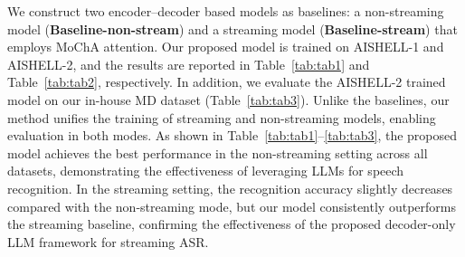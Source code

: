 \documentclass{article}
\begin{document}
We construct two encoder–decoder based models as baselines: a non-streaming model (\textbf{Baseline-non-stream}) and a streaming model (\textbf{Baseline-stream}) that employs MoChA attention. Our proposed model is trained on AISHELL-1 and AISHELL-2, and the results are reported in Table~\ref{tab:tab1} and Table~\ref{tab:tab2}, respectively. In addition, we evaluate the AISHELL-2 trained model on our in-house MD dataset (Table~\ref{tab:tab3}).
Unlike the baselines, our method unifies the training of streaming and non-streaming models, enabling evaluation in both modes. As shown in Table~\ref{tab:tab1}–\ref{tab:tab3}, the proposed model achieves the best performance in the non-streaming setting across all datasets, demonstrating the effectiveness of leveraging LLMs for speech recognition. In the streaming setting, the recognition accuracy slightly decreases compared with the non-streaming mode, but our model consistently outperforms the streaming baseline, confirming the effectiveness of the proposed decoder-only LLM framework for streaming ASR.



\end{document}
